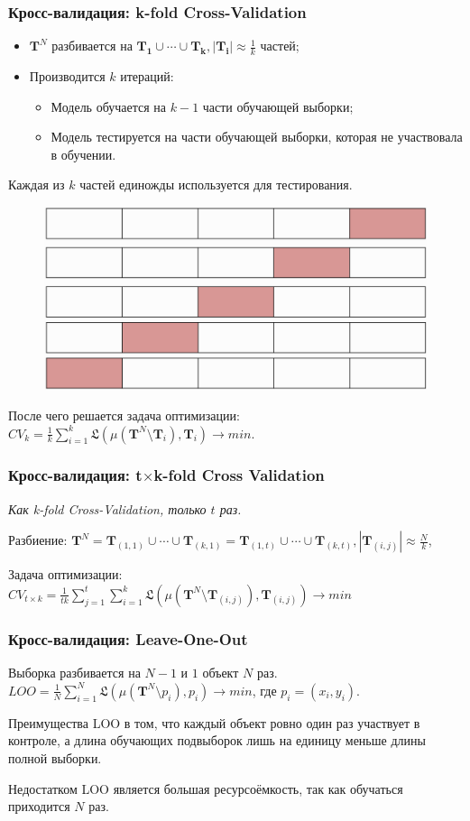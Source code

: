 \documentclass[11pt]{beamer}
\begin{document}
    \begin{frame}
		\frametitle{Кросс-валидация: k-fold Cross-Validation}
		\begin{itemize}
			\item $\bm{T}^N$ разбивается на $ \bm{T_1}\cup\cdots\cup\bm{T_k}, |\bm{T_i}|\approx \frac{1}{k} $ частей;
			\item Производится $ k $ итераций:
			\begin{itemize}
				\item Модель обучается на $ k-1 $ части обучающей выборки;
				\item Модель тестируется на части обучающей выборки, которая не участвовала в обучении.
			\end{itemize}
		\end{itemize}
		Каждая из $ k $ частей единожды используется для тестирования.
		
		\begin{figure}
			\includegraphics[width=0.4\linewidth]{imgs/K-fold-validation}
		\end{figure}
		После чего решается задача оптимизации:
		$CV_k = \frac{1}{k}\sum\limits_{i=1}^k\mathfrak{L}(\mu(\bm{T}^N \setminus \bm{T}_i), \bm{T}_i) \rightarrow min$.
	\end{frame}

	\begin{frame}
		\frametitle{Кросс-валидация: t$\times$k-fold Cross Validation}
		\begin{center}
			\textit{Как k-fold Cross-Validation, только $t$ раз.}
		\end{center}
		
		Разбиение:
		$\bm{T}^N = \bm{T}_{(1,1)}\cup\cdots\cup\bm{T}_{(k,1)}=\bm{T}_{(1,t)}\cup\cdots\cup\bm{T}_{(k,t)},|\bm{T}_{(i,j)}|\approx \frac{N}{k} $, 
		 
		Задача оптимизации: 
		$CV_{t\times k} = \frac{1}{tk}\sum\limits_{j=1}^t\sum\limits_{i=1}^k\mathfrak{L}(\mu(\bm{T}^N \setminus \bm{T}_{(i,j)}), \bm{T}_{(i,j)}) \rightarrow min$
	\end{frame}

	\begin{frame}
		\frametitle{Кросс-валидация: Leave-One-Out}
		Выборка разбивается на $ N-1 $ и $ 1 $ объект $ N $ раз.
		$LOO = \frac{1}{N}\sum\limits_{i=1}^N\mathfrak{L}(\mu(\bm{T}^N \setminus p_i), p_i) \rightarrow min$, где $ p_i = (x_i, y_i) $.
		
		Преимущества LOO в том, что каждый объект ровно один раз участвует в контроле, а длина обучающих подвыборок лишь на единицу меньше длины полной выборки.
		
		Недостатком LOO является большая ресурсоёмкость, так как обучаться приходится $ N $ раз.
	\end{frame}
\end{document}
